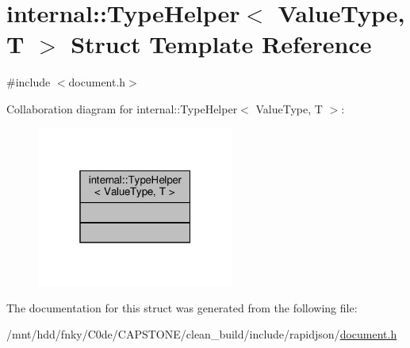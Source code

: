 \hypertarget{structinternal_1_1TypeHelper}{}\section{internal\+:\+:Type\+Helper$<$ Value\+Type, T $>$ Struct Template Reference}
\label{structinternal_1_1TypeHelper}


{\ttfamily \#include $<$document.\+h$>$}



Collaboration diagram for internal\+:\+:Type\+Helper$<$ Value\+Type, T $>$\+:
\nopagebreak
\begin{figure}[H]
\begin{center}
\leavevmode
\includegraphics[width=184pt]{structinternal_1_1TypeHelper__coll__graph}
\end{center}
\end{figure}


The documentation for this struct was generated from the following file\+:\begin{DoxyCompactItemize}
\item 
/mnt/hdd/fnky/\+C0de/\+C\+A\+P\+S\+T\+O\+N\+E/clean\+\_\+build/include/rapidjson/\hyperlink{document_8h}{document.\+h}\end{DoxyCompactItemize}

